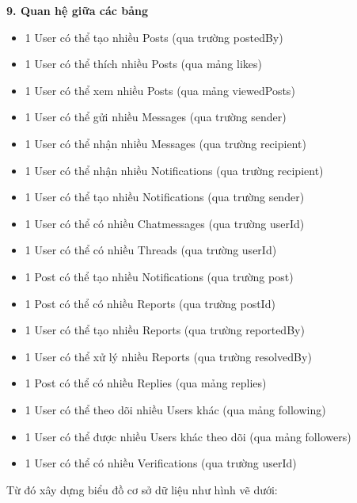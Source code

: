 \textbf{9. Quan hệ giữa các bảng}

\begin{itemize}
\item 1 User có thể tạo nhiều Posts (qua trường postedBy)
\item 1 User có thể thích nhiều Posts (qua mảng likes)
\item 1 User có thể xem nhiều Posts (qua mảng viewedPosts)
\item 1 User có thể gửi nhiều Messages (qua trường sender)
\item 1 User có thể nhận nhiều Messages (qua trường recipient)
\item 1 User có thể nhận nhiều Notifications (qua trường recipient)
\item 1 User có thể tạo nhiều Notifications (qua trường sender)
\item 1 User có thể có nhiều Chatmessages (qua trường userId)
\item 1 User có thể có nhiều Threads (qua trường userId)
\item 1 Post có thể tạo nhiều Notifications (qua trường post)
\item 1 Post có thể có nhiều Reports (qua trường postId)
\item 1 User có thể tạo nhiều Reports (qua trường reportedBy)
\item 1 User có thể xử lý nhiều Reports (qua trường resolvedBy)
\item 1 Post có thể có nhiều Replies (qua mảng replies)
\item 1 User có thể theo dõi nhiều Users khác (qua mảng following)
\item 1 User có thể được nhiều Users khác theo dõi (qua mảng followers)
\item 1 User có thể có nhiều Verifications (qua trường userId)
\end{itemize}
Từ đó xây dựng biểu đồ cơ sở dữ liệu như hình vẽ dưới:


